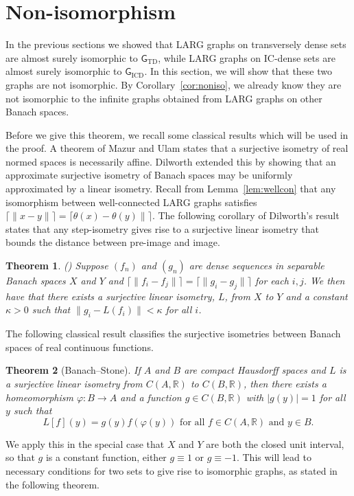 \documentclass{daj}
\newtheorem{thm}{Theorem}
\newcommand{\R}{\mathbb R}
\begin{document}
\section{Non-isomorphism}

In the previous sections we showed that LARG graphs on transversely dense sets are
almost surely isomorphic to $\mathsf G_\text{TD}$, while LARG
graphs on IC-dense sets are almost surely isomorphic to  $\mathsf G_\text{ICD}$.
In this section, we will show that these two graphs are not isomorphic.
By Corollary~\ref{cor:noniso}, we already know they are not isomorphic to the infinite
graphs obtained from LARG graphs on other Banach spaces.

Before we give this theorem, we recall some classical results which will be
used in the proof. A theorem of Mazur and Ulam \cite{mu} states that a
surjective isometry of real normed spaces is necessarily affine.
Dilworth \cite{Dilworth} extended this by showing that an approximate
surjective isometry of Banach spaces may be uniformly approximated by
a linear isometry. Recall from Lemma~\ref{lem:wellcon}
that any isomorphism between well-connected LARG graphs
satisfies $\lceil \|x-y\|\rceil=\lceil \theta(x)-\theta(y)\|\rceil$. The
following corollary of Dilworth's result states that any step-isometry
gives rise to a surjective linear isometry that bounds the distance
between pre-image and image.

\begin{thm}\label{thm:Dilworth}(\cite{BJQ1})
Suppose $(f_n)$ and $(g_n)$ are dense sequences in separable Banach
spaces $X$ and $Y$ and $\lceil \|f_i-f_j\|\rceil =
\lceil \|g_i-g_j\|\rceil$ for each $i,j$.
We then have that there exists a surjective
linear isometry, $L$, from $X$ to $Y$ and a constant $\kappa>0$ such that
$\|g_i-L(f_i)\|<\kappa$
for all $i$.
\end{thm}

The following classical result classifies the surjective isometries between Banach
spaces of real continuous functions.

\begin{thm}[Banach--Stone]\label{thm:BS}
If $A$ and $B$ are compact Hausdorff spaces and $L$ is a surjective linear isometry from
$C(A,\R)$
to $C(B,\R)$, then there exists a homeomorphism $\varphi\colon B\to A$ and a function
$g\in C(B,\R)$ with $|g(y)|=1$ for all $y$ such that
$$
L[f](y)=g(y)f(\varphi(y))\text{ for all $f\in C(A,\R)$ and $y\in B$.}
$$
\end{thm}

We apply this in the special case that $X$ and $Y$ are both the closed unit interval,
so that $g$ is a constant function, either $g\equiv1$ or $g\equiv-1$.
This will lead to necessary conditions for two sets to give rise to isomorphic
graphs, as stated in the following theorem.
\end{document}
